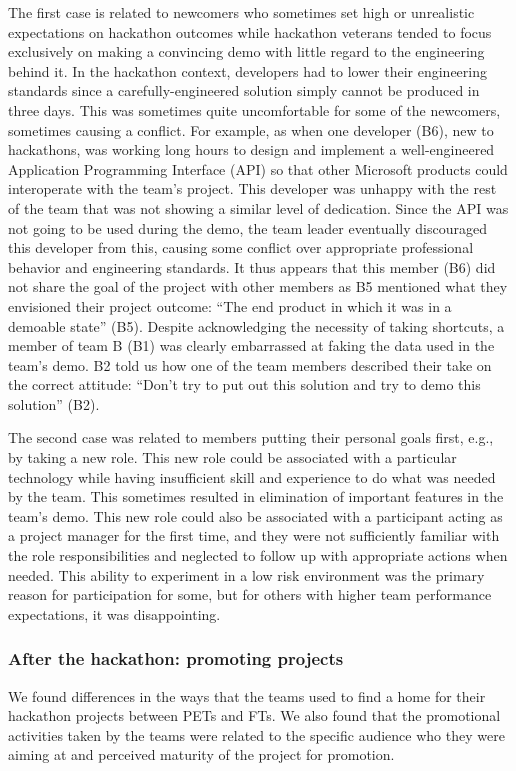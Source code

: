 \documentclass{hcij}
\begin{document}
The first case is related to newcomers who sometimes set high or unrealistic expectations on hackathon outcomes while hackathon veterans tended to focus exclusively on making a convincing demo with little regard to the engineering behind it. In the hackathon context, developers had to lower their engineering standards since a carefully-engineered solution simply cannot be produced in three days. This was sometimes quite uncomfortable for some of the newcomers, sometimes causing a conflict. For example, as when one developer (B6), new to hackathons, was working long hours to design and implement a well-engineered Application Programming Interface (API) so that other Microsoft products could interoperate with the team’s project. This developer was unhappy with the rest of the team that was not showing a similar level of dedication. Since the API was not going to be used during the demo, the team leader eventually discouraged this developer from this, causing some conflict over appropriate professional behavior and engineering standards. It thus appears that this member (B6) did not share the goal of the project with other members as B5 mentioned what they envisioned their project outcome: “The end product in which it was in a demoable state” (B5). Despite acknowledging the necessity of taking shortcuts, a member of team B (B1) was clearly embarrassed at faking the data used in the team’s demo. B2 told us how one of the team members described their take on the correct attitude: “Don’t try to put out this solution and try to demo this solution” (B2).

The second case was related to members putting their personal goals first, e.g., by taking a new role. This new role could be associated with a particular technology while having insufficient skill and experience to do what was needed by the team. This sometimes resulted in elimination of important features in the team’s demo. This new role could also be associated with a participant acting as a project manager for the first time, and they were not sufficiently familiar with the role responsibilities and neglected to follow up with appropriate actions when needed. This ability to experiment in a low risk environment was the primary reason for participation for some, but for others with higher team performance expectations, it was disappointing.

\subsubsection{After the hackathon: promoting projects}
We found differences in the ways that the teams used to find a home for their hackathon projects between PETs and FTs. We also found that the promotional activities taken by the teams were related to the specific audience who they were aiming at and perceived maturity of the project for promotion.
\end{document}
